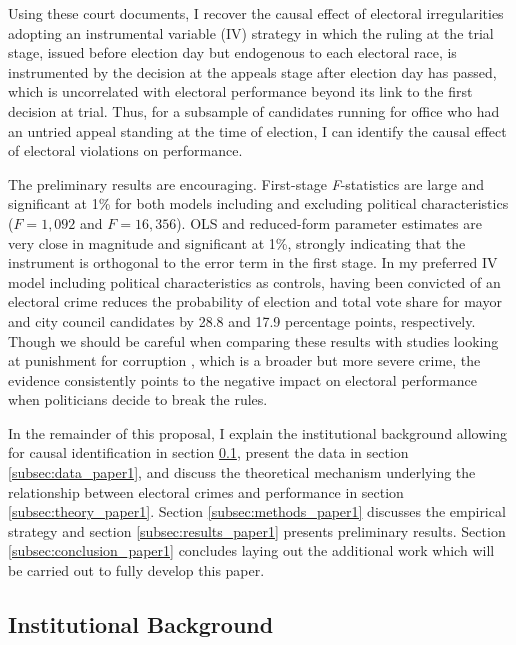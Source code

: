 \documentclass[11pt]{article}
\begin{document}
Using these court documents, I recover the causal effect of electoral irregularities adopting an instrumental variable (IV) strategy in which the ruling at the trial stage, issued before election day but endogenous to each electoral race, is instrumented by the decision at the appeals stage after election day has passed, which is uncorrelated with electoral performance beyond its link to the first decision at trial. Thus, for a subsample of candidates running for office who had an untried appeal standing at the time of election, I can identify the causal effect of electoral violations on performance.

The preliminary results are encouraging. First-stage \emph{F}-statistics are large and significant at 1\% for both models including and excluding political characteristics ($F = 1{,}092$ and $F = 16{,}356$). OLS and reduced-form parameter estimates are very close in magnitude and significant at 1\%, strongly indicating that the instrument is orthogonal to the error term in the first stage. In my preferred IV model including political characteristics as controls, having been convicted of an electoral crime reduces the probability of election and total vote share for mayor and city council candidates by 28.8 and 17.9 percentage points, respectively. Though we should be careful when comparing these results with studies looking at punishment for corruption \citep{FerrazExposingCorruptPoliticians2008b,FerrazElectoralAccountabilityCorruption2011a,WintersLackingInformationCondoning2013}, which is a broader but more severe crime, the evidence consistently points to the negative impact on electoral performance when politicians decide to break the rules.

In the remainder of this proposal, I explain the institutional background allowing for causal identification in section \ref{subsec:background_paper1}, present the data in section \ref{subsec:data_paper1}, and discuss the theoretical mechanism underlying the relationship between electoral crimes and performance in section \ref{subsec:theory_paper1}. Section \ref{subsec:methods_paper1} discusses the empirical strategy and section \ref{subsec:results_paper1} presents preliminary results. Section \ref{subsec:conclusion_paper1} concludes laying out the additional work which will be carried out to fully develop this paper.

\clearpage

\subsection{Institutional Background} \label{subsec:background_paper1}
\end{document}
